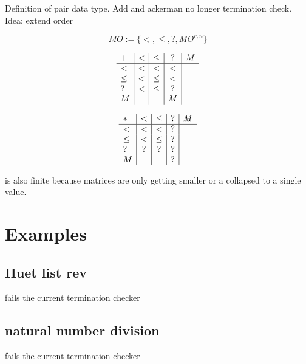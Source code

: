Definition of pair data type.
Add and ackerman no longer termination check.
Idea: extend order

\begin{definition}[MOrder]
\[ MO := \{ < , \leq , ? , MO^{r,n}\} \]
\end{definition}

\begin{definition}
\[
\begin{array}{l | c |c | c | c}

 +    &  <   &  \leq   &  ? & M \\
 \hline 
 <    &  <   & <       &  < &  \\
 \leq &  <   & \leq    &  < &  \\
 ?    &  <   & \leq    &  ? &  \\
 M    &      &         &  M &  
\end{array}
\]

\end{definition}


\begin{definition}
\[
\begin{array}{l | c |c | c| c }
 *    &  <  &  \leq &   ? & M \\
\hline
  <   & <    & <    &   ? &   \\
 \leq & <    & \leq &   ? &   \\
 ?    & ?    & ?    &   ? &   \\
 M    &      &      &   ? &
\end{array}
\]
\end{definition}

\begin{definition}
is also finite because matrices are only getting smaller or a collapsed to a single value.
\end{definition}

\section{Examples}

\subsection{Huet list rev}
fails the current termination checker
\subsection{natural number division}
fails the current termination checker
